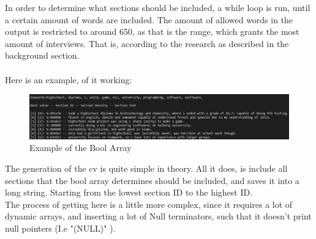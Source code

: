 In order to determine what sections should be included, a while loop is run, until a certain amount of words are included.
The amount of allowed words in the output is restricted to around 650, as that is the range, which grants the most amount of interviews.
That is, according to the research as described in the background section.
\\ \\
Here is an example, of it working: 
\begin{figure}[H]
  \centering
  \includegraphics[scale = 0.6]{figures/bool_example.png}
  \caption{Example of the Bool Array}
\end{figure}
The generation of the cv is quite simple in theory. All it does, is include all sections that the bool array determines should be included, and saves it into a long string.
Starting from the lowest section ID to the highest ID. \\
The process of getting here is a little more complex, since it requires a lot of dynamic arrays, and inserting a lot of Null terminators, such that it doesn't print null pointers (I.e "(NULL)" ).


